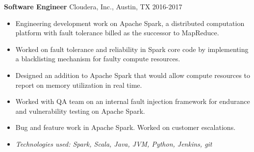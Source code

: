 \textbf{Software Engineer} Cloudera, Inc., Austin, TX \hfill 2016-2017

\begin{itemize} \itemsep -2pt

\item Engineering development work on Apache Spark, a distributed computation
      platform with fault tolerance billed as the successor to MapReduce.

\item Worked on fault tolerance and reliability in Spark core code by
      implementing a blacklisting mechanism for faulty compute resources.

\item Designed an addition to Apache Spark that would allow compute resources to
      report on memory utilization in real time.

\item Worked with QA team on an internal fault injection framework for
      endurance and vulnerability testing on Apache Spark.

\item Bug and feature work in Apache Spark. Worked on
      customer escalations.

\item \textit{Technologies used: Spark, Scala, Java, JVM, Python, Jenkins, git}

\end{itemize}
